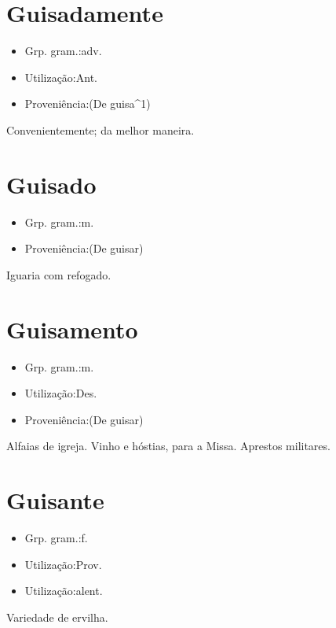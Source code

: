 \section{Guisadamente}
\begin{itemize}
\item {Grp. gram.:adv.}
\end{itemize}
\begin{itemize}
\item {Utilização:Ant.}
\end{itemize}
\begin{itemize}
\item {Proveniência:(De \textunderscore guisa\textunderscore ^1)}
\end{itemize}
Convenientemente; da melhor maneira.
\section{Guisado}
\begin{itemize}
\item {Grp. gram.:m.}
\end{itemize}
\begin{itemize}
\item {Proveniência:(De \textunderscore guisar\textunderscore )}
\end{itemize}
Iguaria com refogado.
\section{Guisamento}
\begin{itemize}
\item {Grp. gram.:m.}
\end{itemize}
\begin{itemize}
\item {Utilização:Des.}
\end{itemize}
\begin{itemize}
\item {Proveniência:(De \textunderscore guisar\textunderscore )}
\end{itemize}
Alfaias de igreja.
Vinho e hóstias, para a Missa.
Aprestos militares.
\section{Guisante}
\begin{itemize}
\item {Grp. gram.:f.}
\end{itemize}
\begin{itemize}
\item {Utilização:Prov.}
\end{itemize}
\begin{itemize}
\item {Utilização:alent.}
\end{itemize}
Variedade de ervilha.
